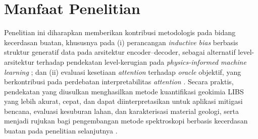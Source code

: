 \section{Manfaat Penelitian}
Penelitian ini diharapkan memberikan kontribusi metodologis pada bidang kecerdasan buatan, khususnya pada (i) perancangan \textit{inductive bias} berbasis struktur generatif data pada arsitektur encoder--decoder, sebagai alternatif level-arsitektur terhadap pendekatan level-kerugian pada \textit{physics-informed machine learning} \citep{karniadakis_physics-informed_2021}; dan (ii) evaluasi kesetiaan \textit{attention} terhadap \textit{oracle} objektif, yang berkontribusi pada perdebatan interpretabilitas \textit{attention} \citep{jain_attention_2019, wiegreffe_attention_2019, bibal_attention_2022}. Secara praktis, pendekatan yang diusulkan menghasilkan metode kuantifikasi geokimia LIBS yang lebih akurat, cepat, dan dapat diinterpretasikan untuk aplikasi mitigasi bencana, evaluasi kesuburan lahan, dan karakterisasi material geologi, serta menjadi rujukan bagi pengembangan metode spektroskopi berbasis kecerdasan buatan pada penelitian selanjutnya \citep{idris_geochemistry_2022, manelski_libs_2024}.
